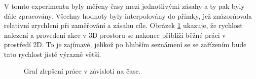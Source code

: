 V tomto experimentu byly měřeny časy mezi jednotlivými zásahy a ty pak byly dále zpracovány. Všechny hodnoty byly interpolovány do přímky, jež znázorňovala relativní zrychlení při zaměřování a zásahu cíle. Obrázek \ref{graf} ukazuje, že rychlost nalezení a provedení akce v 3D prostoru se nakonec přiblíží běžné práci v prostředí 2D.
To je zajímavé, jelikož po hlubším seznámení se se zařízením bude tato rychlost jistě výrazně větší.

\begin{figure}[h]
\centering
{}
\caption{Graf zlepšení práce v závisloti na čase.}
\label{graf}
\end{figure}

